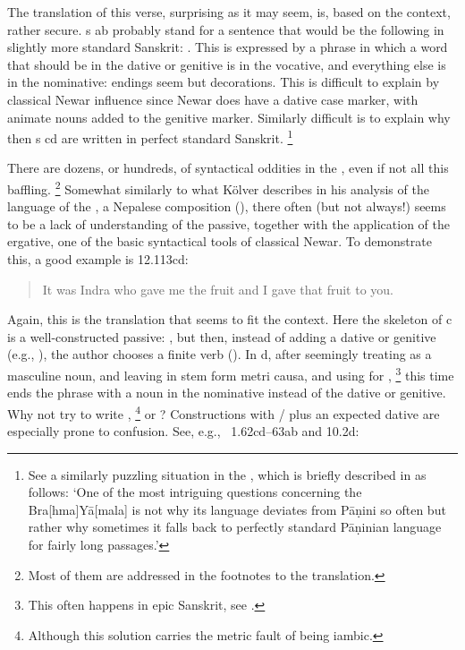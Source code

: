 \noindent            
The translation of this verse, surprising as it may seem, is, based on the
context, rather secure. s ab probably stand for a sentence that would
be the following in slightly more standard Sanskrit:
.
This is expressed by a phrase in which a word that should be 
in the dative or genitive  is in the vocative, and  
everything else is in the nominative: endings seem but
decorations. This is difficult to explain by classical Newar influence since Newar
does have a dative case marker, with animate nouns added to the genitive
marker. Similarly difficult is to explain why then s cd
are written in perfect standard Sanskrit.%
		\footnote{See a similarly puzzling situation in the \BraYa, 
						which is briefly described in  as follows:
		`One of the most intriguing questions concerning the Bra[hma]Yā[mala] 
		is not why its language deviates from Pāṇini so often 
		but rather why sometimes it falls back to perfectly standard 
		Pāṇinian language for fairly long passages.'}

There are dozens, or hundreds, of syntactical oddities in the \VSS,
even if not all this baffling.%
		\footnote{Most of them are addressed in the footnotes 
									to the translation.}
Somewhat similarly to what Kölver describes in 
his analysis of the language of the \SvayP, a Nepalese composition (),
there often (but not always!) seems to be a lack of understanding of the
passive, together with the application of the ergative, one of the
basic syntactical tools of classical Newar. To demonstrate this, a good 
example is 12.113cd:

\begin{quote}

It was Indra who gave me the fruit and I gave that fruit to you.
\end{quote}

\noindent
Again, this is the translation that seems to fit the context. 
Here the skeleton of  c is a well-constructed passive:
, but then, instead of adding a dative or 
genitive (e.g., ), the author chooses 
a finite verb (). In  d, after seemingly 
treating  as a masculine noun, and leaving
 in stem form metri causa, and using  for ,%
		\footnote{This often happens in epic Sanskrit, see 
			.}
this time ends the phrase with a noun in the nominative  instead of
the dative or genitive. Why not try to write ,%
		\footnote{Although this solution carries the metric fault of 
								being iambic.}
or ?
Constructions with / plus an expected dative 
are especially prone to confusion. See, e.g., \VSS\ 1.62cd--63ab and 
10.2d:

